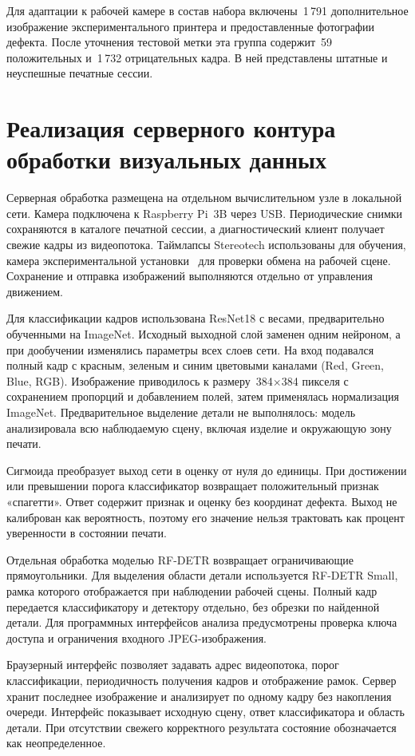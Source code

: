 Для адаптации к рабочей камере в состав набора включены~1\,791 дополнительное изображение экспериментального принтера и предоставленные фотографии дефекта. После уточнения тестовой метки эта группа содержит~59 положительных и~1\,732 отрицательных кадра. В ней представлены штатные и неуспешные печатные сессии.

\section{Реализация серверного контура обработки визуальных данных}

Серверная обработка размещена на отдельном вычислительном узле в локальной сети. Камера подключена к Raspberry Pi~3B через USB. Периодические снимки сохраняются в каталоге печатной сессии, а диагностический клиент получает свежие кадры из видеопотока. Таймлапсы Stereotech использованы для обучения, камера экспериментальной установки~\textemdash{} для проверки обмена на рабочей сцене. Сохранение и отправка изображений выполняются отдельно от управления движением.

Для классификации кадров использована ResNet18 с весами, предварительно обученными на ImageNet. Исходный выходной слой заменен одним нейроном, а при дообучении изменялись параметры всех слоев сети. На вход подавался полный кадр с красным, зеленым и синим цветовыми каналами (Red, Green, Blue, RGB). Изображение приводилось к размеру~384\(\times\)384 пикселя с сохранением пропорций и добавлением полей, затем применялась нормализация ImageNet. Предварительное выделение детали не выполнялось: модель анализировала всю наблюдаемую сцену, включая изделие и окружающую зону печати.

Сигмоида преобразует выход сети в оценку от нуля до единицы. При достижении или превышении порога классификатор возвращает положительный признак «спагетти». Ответ содержит признак и оценку без координат дефекта. Выход не калиброван как вероятность, поэтому его значение нельзя трактовать как процент уверенности в состоянии печати.

Отдельная обработка моделью RF-DETR возвращает ограничивающие прямоугольники. Для выделения области детали используется RF-DETR Small, рамка которого отображается при наблюдении рабочей сцены. Полный кадр передается классификатору и детектору отдельно, без обрезки по найденной детали. Для программных интерфейсов анализа предусмотрены проверка ключа доступа и ограничения входного JPEG-изображения.

Браузерный интерфейс позволяет задавать адрес видеопотока, порог классификации, периодичность получения кадров и отображение рамок. Сервер хранит последнее изображение и анализирует по одному кадру без накопления очереди. Интерфейс показывает исходную сцену, ответ классификатора и область детали. При отсутствии свежего корректного результата состояние обозначается как неопределенное.

